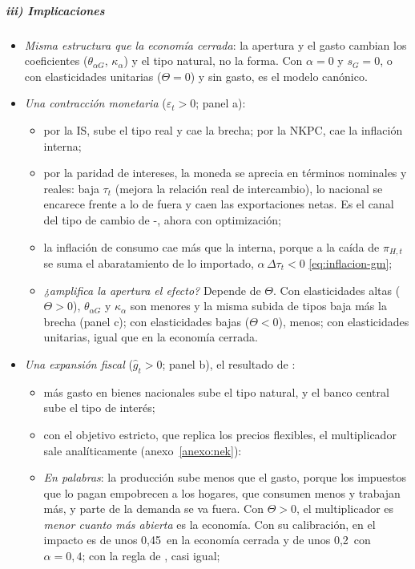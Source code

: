 \documentclass[11pt]{article}
\begin{document}
\subparagraph{iii) Implicaciones}

\begin{itemize}
\item \emph{Misma estructura que la economía cerrada}: la apertura y el gasto cambian los coeficientes ($\theta_{\alpha G}$, $\kappa_\alpha$) y el tipo natural, no la forma. Con $\alpha=0$ y $s_G=0$, o con elasticidades unitarias ($\Theta=0$) y sin gasto, es el modelo canónico\nocite{Gali2015Monetary}.
\item \emph{Una contracción monetaria} ($\varepsilon_t>0$; panel a):
  \begin{itemize}
  \item por la IS, sube el tipo real y cae la brecha; por la NKPC, cae la inflación interna;
  \item por la paridad de intereses, la moneda se aprecia en términos nominales y reales: baja $\tau_t$ (mejora la relación real de intercambio), lo nacional se encarece frente a lo de fuera y caen las exportaciones netas. Es el canal del tipo de cambio de -, ahora con optimización\nocite{Gali2015Monetary};
  \item la inflación de consumo cae más que la interna, porque a la caída de $\pi_{H,t}$ se suma el abaratamiento de lo importado, $\alpha\,\Delta\tau_t<0$ \eqref{eq:inflacion-gm};
  \item \emph{¿amplifica la apertura el efecto?} Depende de $\Theta$. Con elasticidades altas ($\Theta>0$), $\theta_{\alpha G}$ y $\kappa_\alpha$ son menores y la misma subida de tipos baja más la brecha (panel c); con elasticidades bajas ($\Theta<0$), menos; con elasticidades unitarias, igual que en la economía cerrada.
  \end{itemize}
\item \emph{Una expansión fiscal} ($\hat g_t>0$; panel b), el resultado de \textcite{Furlanetto2006Fiscal}:
  \begin{itemize}
  \item más gasto en bienes nacionales sube el tipo natural, y el banco central sube el tipo de interés;
  \item con el objetivo estricto, que replica los precios flexibles, el multiplicador sale analíticamente (anexo~\ref{anexo:nek}):
  \item \emph{En palabras}: la producción sube menos que el gasto, porque los impuestos que lo pagan empobrecen a los hogares, que consumen menos y trabajan más, y parte de la demanda se va fuera. Con $\Theta>0$, el multiplicador es \emph{menor cuanto más abierta} es la economía. Con su calibración, en el impacto es de unos 0,45~en la economía cerrada y de unos 0,2~con $\alpha=0{,}4$; con la regla de , casi igual;

\end{itemize}
\end{itemize}
\end{document}
